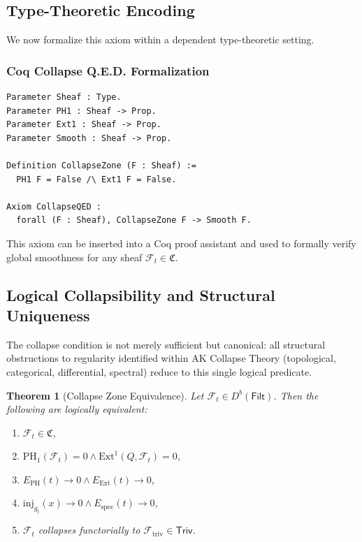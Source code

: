 \documentclass[11pt]{article}
\newtheorem{theorem}{Theorem}[section]
\begin{document}
\subsection{Type-Theoretic Encoding}

We now formalize this axiom within a dependent type-theoretic setting.

\subsubsection*{Coq Collapse Q.E.D. Formalization}
\begin{lstlisting}
Parameter Sheaf : Type.
Parameter PH1 : Sheaf -> Prop.
Parameter Ext1 : Sheaf -> Prop.
Parameter Smooth : Sheaf -> Prop.

Definition CollapseZone (F : Sheaf) :=
  PH1 F = False /\ Ext1 F = False.

Axiom CollapseQED :
  forall (F : Sheaf), CollapseZone F -> Smooth F.
\end{lstlisting}

This axiom can be inserted into a Coq proof assistant and used to formally verify global smoothness for any sheaf \( \mathcal{F}_t \in \mathfrak{C} \).

\subsection{Logical Collapsibility and Structural Uniqueness}

The collapse condition is not merely sufficient but canonical: all structural obstructions to regularity identified within AK Collapse Theory (topological, categorical, differential, spectral) reduce to this single logical predicate.

\begin{theorem}[Collapse Zone Equivalence]
Let \( \mathcal{F}_t \in D^b(\mathsf{Filt}) \). Then the following are logically equivalent:
\begin{enumerate}
  \item \( \mathcal{F}_t \in \mathfrak{C} \),
  \item \( \mathrm{PH}_1(\mathcal{F}_t) = 0 \land \mathrm{Ext}^1(Q, \mathcal{F}_t) = 0 \),
  \item \( E_{\mathrm{PH}}(t) \to 0 \land E_{\mathrm{Ext}}(t) \to 0 \),
  \item \( \mathrm{inj}_{g_t}(x) \to 0 \land E_{\mathrm{spec}}(t) \to 0 \),
  \item \( \mathcal{F}_t \) collapses functorially to \( \mathcal{F}_{\mathrm{triv}} \in \mathsf{Triv} \).
\end{enumerate}
\end{theorem}
\end{document}
